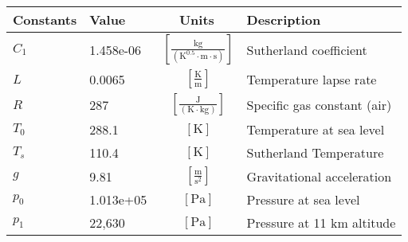 \documentclass[12pt]{article}
\begin{document}
{\footnotesize
\begin{longtable}{llcl}
\toprule
Constants & Value & Units & Description \\ \midrule
$C_1$ & 1.458e-06  & $~\mathrm{[\tfrac{kg}{\left(K^{0.5}\cdot m\cdot s\right)}]}$ & Sutherland coefficient \\
$L$ & 0.0065  & $~\mathrm{[\tfrac{K}{m}]}$ & Temperature lapse rate \\
$R$ & 287  & $~\mathrm{[\tfrac{J}{\left(K\cdot kg\right)}]}$ & Specific gas constant (air) \\
$T_0$ & 288.1  & $~\mathrm{[K]}$ & Temperature at sea level \\
$T_s$ & 110.4  & $~\mathrm{[K]}$ & Sutherland Temperature \\
$g$ & 9.81  & $~\mathrm{[\tfrac{m}{s^2}]}$ & Gravitational acceleration \\
$p_0$ & 1.013e+05  & $~\mathrm{[Pa]}$ & Pressure at sea level \\
$p_1$ & 22,630& $~\mathrm{[Pa]}$ & Pressure at 11 km altitude\\
\bottomrule
\end{longtable}}
\end{document}
